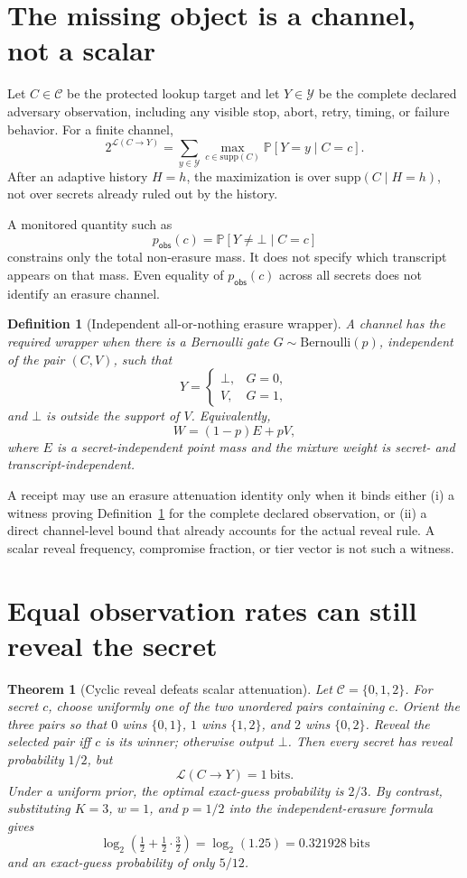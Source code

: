 \documentclass[11pt]{article}
\newcommand{\Prb}{\mathbb{P}}
\newcommand{\supp}{\mathrm{supp}}
\newcommand{\MaxL}{\mathcal{L}}
\newcommand{\bits}{\mathrm{bits}}
\newcommand{\logtwo}{\log_2}
\newcommand{\C}{\mathcal{C}} %
\newcommand{\Y}{\mathcal{Y}} %
\newtheorem{theorem}{Theorem}
\newtheorem{definition}{Definition}
\begin{document}
\section{The missing object is a channel, not a scalar}\label{sec:channel}
Let \(C\in\C\) be the protected lookup target and let \(Y\in\Y\) be the complete declared adversary observation, including any visible stop, abort, retry, timing, or failure behavior. For a finite channel,
\[
2^{\MaxL(C\to Y)}=\sum_{y\in\Y}\max_{c\in\supp(C)}\Prb[Y=y\mid C=c].
\]
After an adaptive history \(H=h\), the maximization is over \(\supp(C\mid H=h)\), not over secrets already ruled out by the history.

A monitored quantity such as
\[
p_{\mathsf{obs}}(c)=\Prb[Y\neq\bot\mid C=c]
\]
constrains only the total non-erasure mass. It does not specify which transcript appears on that mass. Even equality of \(p_{\mathsf{obs}}(c)\) across all secrets does not identify an erasure channel.

\begin{definition}[Independent all-or-nothing erasure wrapper]\label{def:erasure}
A channel has the required wrapper when there is a Bernoulli gate \(G\sim\mathrm{Bernoulli}(p)\), independent of the pair \((C,V)\), such that
\[
Y=\begin{cases}
\bot,&G=0,\\
V,&G=1,
\end{cases}
\]
and \(\bot\) is outside the support of \(V\). Equivalently,
\[
W=(1-p)E+pV,
\]
where \(E\) is a secret-independent point mass and the mixture weight is secret- and transcript-independent.
\end{definition}

A receipt may use an erasure attenuation identity only when it binds either (i) a witness proving Definition~\ref{def:erasure} for the complete declared observation, or (ii) a direct channel-level bound that already accounts for the actual reveal rule. A scalar reveal frequency, compromise fraction, or tier vector is not such a witness.

\section{Equal observation rates can still reveal the secret}\label{sec:counterexample}
\begin{theorem}[Cyclic reveal defeats scalar attenuation]\label{thm:cyclic}
Let \(\C=\{0,1,2\}\). For secret \(c\), choose uniformly one of the two unordered pairs containing \(c\). Orient the three pairs so that \(0\) wins \(\{0,1\}\), \(1\) wins \(\{1,2\}\), and \(2\) wins \(\{0,2\}\). Reveal the selected pair iff \(c\) is its winner; otherwise output \(\bot\).
Then every secret has reveal probability \(1/2\), but
\[
\MaxL(C\to Y)=1\ \bits.
\]
Under a uniform prior, the optimal exact-guess probability is \(2/3\).
By contrast, substituting \(K=3\), \(w=1\), and \(p=1/2\) into the independent-erasure formula gives
\[
\logtwo\!\left(\tfrac12+\tfrac12\cdot\tfrac32\right)
=\logtwo(1.25)
=0.321928\ \bits
\]
and an exact-guess probability of only \(5/12\).
\end{theorem}
\end{document}
